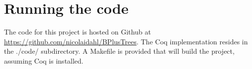 \appendix
\label{sec:Appendix}
\section{Running the code}
The code for this project is hosted on Github at \url{https://github.com/nicolaidahl/BPlusTrees}. The Coq implementation resides in the ./code/ subdirectory. A Makefile is provided that will build the project, assuming Coq is installed.